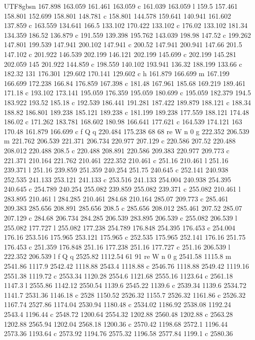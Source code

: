 \documentclass[11pt,a4paper,oneside]{report}
\begin{document}
\begin{CJK*}{UTF8}{gbsn}
{167.898 163.059 161.461 163.059 c 161.039 163.059 l 159.5 157.461 158.801 152.699 158.801 148.781 c
158.801 144.578 159.641 140.941 161.602 137.859 c 163.559 134.641 166.5 133.102 170.422 133.102 c 176.02
133.102 181.34 134.359 186.52 136.879 c 191.559 139.398 195.762 143.039 198.98 147.52 c 199.262 147.801
199.539 147.941 200.102 147.941 c 200.52 147.941 200.941 147.66 201.5 147.102 c 201.922 146.539 202.199
146.121 202.199 145.699 c 202.199 145.281 202.059 145 201.922 144.859 c 198.559 140.102 193.941 136.32
188.199 133.66 c 182.32 131 176.301 129.602 170.141 129.602 c h 161.879 166.699 m 167.199 166.699 172.238
166.84 176.859 167.398 c 181.48 167.961 185.68 169.219 189.461 171.18 c 193.102 173.141 195.059 176.359
195.059 180.699 c 195.059 182.379 194.5 183.922 193.52 185.18 c 192.539 186.441 191.281 187.422 189.879
188.121 c 188.34 188.82 186.801 189.238 185.121 189.238 c 181.199 189.238 177.559 188.121 174.48 186.02 c
171.262 183.781 168.602 180.98 166.641 177.621 c 164.539 174.121 163 170.48 161.879 166.699 c f Q q
220.484 175.238 68 68 re W n 0 g 222.352 206.539 m 221.762 206.539 221.371 206.734 220.977 207.129 c
220.586 207.52 220.488 208.012 220.488 208.5 c 220.488 208.891 220.586 209.383 220.977 209.773 c 221.371
210.164 221.762 210.461 222.352 210.461 c 251.16 210.461 l 251.16 239.371 l 251.16 239.859 251.359
240.254 251.75 240.645 c 252.141 240.938 252.535 241.133 253.121 241.133 c 253.516 241.133 254.004
240.938 254.395 240.645 c 254.789 240.254 255.082 239.859 255.082 239.371 c 255.082 210.461 l 283.895
210.461 l 284.285 210.461 284.68 210.164 285.07 209.773 c 285.461 209.383 285.656 208.891 285.656 208.5 c
285.656 208.012 285.461 207.52 285.07 207.129 c 284.68 206.734 284.285 206.539 283.895 206.539 c 255.082
206.539 l 255.082 177.727 l 255.082 177.238 254.789 176.848 254.395 176.453 c 254.004 176.16 253.516
175.965 253.121 175.965 c 252.535 175.965 252.141 176.16 251.75 176.453 c 251.359 176.848 251.16 177.238
251.16 177.727 c 251.16 206.539 l 222.352 206.539 l f Q q 2525.82 1112.54 61 91 re W n 0 g 2541.58 1115.8
m 2541.86 1117.9 2542.42 1118.88 2543.4 1118.88 c 2546.76 1118.88 2549.42 1119.16 2551.38 1119.72 c
2553.34 1120.28 2554.6 1121.68 2555.16 1123.64 c 2561.18 1147.3 l 2555.86 1142.12 2550.54 1139.6 2545.22
1139.6 c 2539.34 1139.6 2534.72 1141.7 2531.36 1146.18 c 2528 1150.52 2526.32 1155.7 2526.32 1161.86 c
2526.32 1167.74 2527.86 1174.04 2530.94 1180.48 c 2534.02 1186.92 2538.08 1192.24 2543.4 1196.44 c
2548.72 1200.64 2554.32 1202.88 2560.48 1202.88 c 2563.28 1202.88 2565.94 1202.04 2568.18 1200.36 c
2570.42 1198.68 2572.1 1196.44 2573.36 1193.64 c 2573.92 1194.76 2575.32 1196.58 2577.84 1199.1 c 2580.36
}
\end{CJK*}
\end{document}
